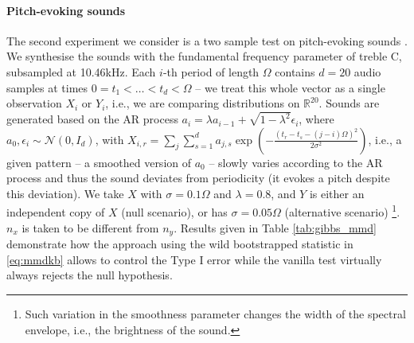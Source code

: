 \documentclass{article} %
\begin{document}
\paragraph{Pitch-evoking sounds}
The second experiment we consider is a two sample test on pitch-evoking
sounds \cite{hehrmannthesis}. We synthesise the sounds with the fundamental frequency
parameter of treble C, subsampled at 10.46kHz. Each $i$-th period
of length $\Omega$ contains $d=20$ audio samples at times $0=t_{1}<\ldots<t_{d}<\Omega$
-- we treat this whole vector as a single observation $X_{i}$ or
$Y_{i}$, i.e., we are comparing distributions on $\mathbb{R}^{20}$.
Sounds are generated based on the AR process $a_{i}=\lambda a_{i-1}+\sqrt{1-\lambda^{2}}\epsilon_{i}$,
where $a_{0},\epsilon_{i}\sim\mathcal{N}(0,I_{d})$, with $X_{i,r}=\sum_{j}\sum_{s=1}^{d}a_{j,s}\exp\left(-\frac{\left(t_{r}-t_{s}-(j-i)\Omega\right)^{2}}{2\sigma^{2}}\right)$,
i.e., a given pattern -- a smoothed version of $a_{0}$ -- slowly
varies according to the AR process and thus the sound deviates from
periodicity (it evokes a pitch despite this deviation). We take
$X$ with $\sigma=0.1\Omega$
and $\lambda=0.8$, and $Y$ is either an independent copy of $X$
(null scenario), or has $\sigma=0.05\Omega$ (alternative scenario)%
\footnote{Such variation in the smoothness parameter changes the width of the
spectral envelope, i.e., the brightness of the sound.}. $n_x$ is taken to be different from $n_y$. Results
given in Table \ref{tab:gibbs_mmd} demonstrate how the
approach using the wild bootstrapped statistic in \eqref{eq:mmdkb} allows to control the Type I error while the vanilla test
virtually always rejects the null hypothesis.
\end{document}
